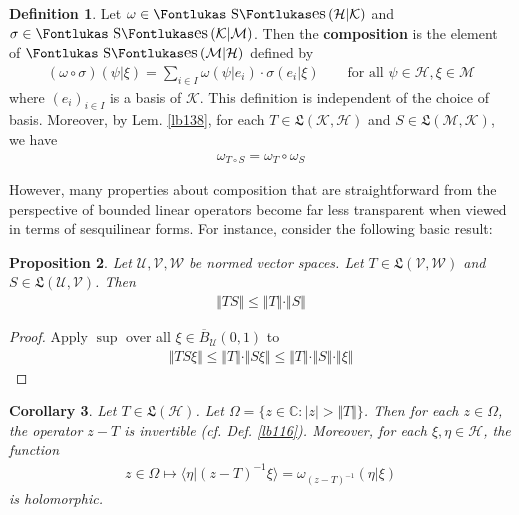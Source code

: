 \documentclass[12pt,b5paper,notitlepage]{article}
\theoremstyle{definition}
\newtheorem{df}{Definition}[section]
\theoremstyle{plain}
\newtheorem{pp}[df]{Proposition}
\newtheorem{co}[df]{Corollary}
\DeclareMathOperator{\Ses}{\text{\Fontlukas S}\text{\kern -0pt {\Fontlukas\large es}}\,}
\newcommand{\fk}{\mathfrak}
\newcommand{\ovl}{\overline}
\newcommand{\bk}[1]{\langle {#1}\rangle}
\newcommand{\Cbb}{\mathbb C}
\newcommand{\MU}{\mathcal U}
\newcommand{\MV}{\mathcal V}
\newcommand{\MW}{\mathcal W}
\newcommand{\MH}{\mathcal H}
\newcommand{\MK}{\mathcal K}
\newcommand{\MM}{\mathcal M}
\numberwithin{equation}{section}
\begin{document}
\begin{df}\label{lb144}
Let $\omega\in\Ses(\MH|\MK)$ and $\sigma\in\Ses(\MK|\MM)$. Then the \textbf{composition} \pmb{$\omega\circ\sigma$}  is the element of $\Ses(\MM|\MH)$ defined by
\begin{align*}
(\omega\circ\sigma)(\psi|\xi)=\sum_{i\in I}\omega(\psi|e_i)\cdot\sigma(e_i|\xi)\qquad\text{for all }\psi\in\MH,\xi\in\MM
\end{align*}
where $(e_i)_{i\in I}$ is a basis of $\MK$. This definition is independent of the choice of basis. Moreover, by Lem. \ref{lb138}, for each $T\in\fk L(\MK,\MH)$ and $S\in\fk L(\MM,\MK)$, we have
\begin{align*}
\omega_{T\circ S}=\omega_T\circ\omega_S
\end{align*}
\end{df}



However, many properties about composition that are straightforward from the perspective of bounded linear operators become far less transparent when viewed in terms of sesquilinear forms. For instance, consider the following basic result:

\begin{pp}\label{lb143}
Let $\MU,\MV,\MW$ be normed vector spaces. Let  $T\in\fk L(\MV,\MW)$ and $S\in\fk L(\MU,\MV)$. Then
\begin{align*}
\Vert TS\Vert\leq \Vert T\Vert\cdot\Vert S\Vert
\end{align*}
\end{pp}

\begin{proof}
Apply $\sup$ over all $\xi\in\ovl B_\MU(0,1)$ to
\begin{align*}
\Vert TS\xi\Vert\leq\Vert T\Vert\cdot \Vert S\xi\Vert\leq \Vert T\Vert\cdot\Vert S\Vert\cdot\Vert\xi\Vert
\end{align*}
\end{proof}



\begin{co}
Let $T\in\fk L(\MH)$. Let $\Omega=\{z\in\Cbb:|z|>\Vert T\Vert\}$. Then for each $z\in\Omega$, the operator $z-T$ is invertible (cf. Def. \ref{lb116}). Moreover, for each $\xi,\eta\in\MH$, the function
\begin{align*}
z\in\Omega\mapsto \bk{\eta|(z-T)^{-1}\xi}=\omega_{(z-T)^{-1}}(\eta|\xi)
\end{align*}
is holomorphic.
\end{co}
\end{document}
